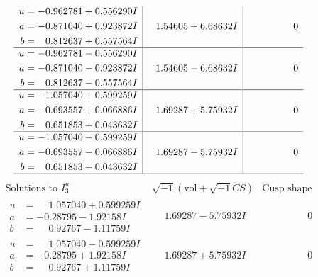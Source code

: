 \documentclass[1p]{elsarticle_modified}
\theoremstyle{definition}
\newcommand{\I}{\sqrt{-1}}
\begin{document}
$$\begin{array}{c|c|c}
\begin{aligned}
u &= -0.962781 + 0.556290 I \\
a &= -0.871040 + 0.923872 I \\
b &= \phantom{-}0.812637 + 0.557564 I\end{aligned}
 & \phantom{-}1.54605 + 6.68632 I & \phantom{-0.000000 } 0 \\ \hline\begin{aligned}
u &= -0.962781 - 0.556290 I \\
a &= -0.871040 - 0.923872 I \\
b &= \phantom{-}0.812637 - 0.557564 I\end{aligned}
 & \phantom{-}1.54605 - 6.68632 I & \phantom{-0.000000 } 0 \\ \hline\begin{aligned}
u &= -1.057040 + 0.599259 I \\
a &= -0.693557 + 0.066886 I \\
b &= \phantom{-}0.651853 + 0.043632 I\end{aligned}
 & \phantom{-}1.69287 + 5.75932 I & \phantom{-0.000000 } 0 \\ \hline\begin{aligned}
u &= -1.057040 - 0.599259 I \\
a &= -0.693557 - 0.066886 I \\
b &= \phantom{-}0.651853 - 0.043632 I\end{aligned}
 & \phantom{-}1.69287 - 5.75932 I & \phantom{-0.000000 } 0\\
 \hline 
 \end{array}$$\newpage$$\begin{array}{c|c|c}  
\text{Solutions to }I^u_{3}& \I (\text{vol} + \sqrt{-1}CS) & \text{Cusp shape}\\
 \hline 
\begin{aligned}
u &= \phantom{-}1.057040 + 0.599259 I \\
a &= -0.28795 - 1.92158 I \\
b &= \phantom{-}0.92767 - 1.11759 I\end{aligned}
 & \phantom{-}1.69287 - 5.75932 I & \phantom{-0.000000 } 0 \\ \hline\begin{aligned}
u &= \phantom{-}1.057040 - 0.599259 I \\
a &= -0.28795 + 1.92158 I \\
b &= \phantom{-}0.92767 + 1.11759 I\end{aligned}
 & \phantom{-}1.69287 + 5.75932 I & \phantom{-0.000000 } 0 \\ \hline\begin{aligned}

\end{aligned}
\end{array}$$
\end{document}
